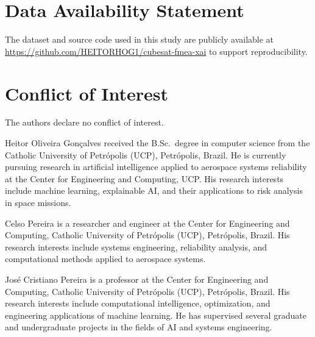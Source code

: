 \documentclass{ieeeaccess}
\begin{document}
\section*{Data Availability Statement}
The dataset and source code used in this study are publicly available at \url{https://github.com/HEITORHOG1/cubesat-fmea-xai} to support reproducibility.

\section*{Conflict of Interest}
The authors declare no conflict of interest.




\begin{IEEEbiographynophoto}{Heitor Oliveira Gon\c{c}alves}
received the B.Sc.\ degree in computer science from the Catholic University of Petr\'{o}polis (UCP), Petr\'{o}polis, Brazil. He is currently pursuing research in artificial intelligence applied to aerospace systems reliability at the Center for Engineering and Computing, UCP. His research interests include machine learning, explainable AI, and their applications to risk analysis in space missions.
\end{IEEEbiographynophoto}

\begin{IEEEbiographynophoto}{Celso Pereira}
is a researcher and engineer at the Center for Engineering and Computing, Catholic University of Petr\'{o}polis (UCP), Petr\'{o}polis, Brazil. His research interests include systems engineering, reliability analysis, and computational methods applied to aerospace systems.
\end{IEEEbiographynophoto}

\begin{IEEEbiographynophoto}{Jos\'{e} Cristiano Pereira}
is a professor at the Center for Engineering and Computing, Catholic University of Petr\'{o}polis (UCP), Petr\'{o}polis, Brazil. His research interests include computational intelligence, optimization, and engineering applications of machine learning. He has supervised several graduate and undergraduate projects in the fields of AI and systems engineering.
\end{IEEEbiographynophoto}

\EOD
\end{document}
